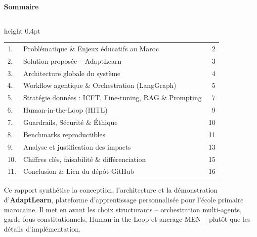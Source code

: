 \documentclass[11pt,a4paper]{article}
\begin{document}
\setcounter{page}{1}

{\color{primary}\Large\bfseries Sommaire}\\[-0.3em]
{\color{rulecolor}\hrule height 0.4pt}\vspace{1em}

\begin{tcolorbox}[colback=panel, colframe=rulecolor, boxrule=0.3pt, arc=1pt,
  left=10pt,right=10pt,top=8pt,bottom=8pt]
\small
\renewcommand{\baselinestretch}{1.15}
\begin{tabular}{@{}p{0.6cm}p{11cm}r@{}}
1.  & Problématique \& Enjeux éducatifs au Maroc               & 2  \\
2.  & Solution proposée -- AdaptLearn                          & 3  \\
3.  & Architecture globale du système                          & 4  \\
4.  & Workflow agentique \& Orchestration (LangGraph)          & 5  \\
5.  & Stratégie données : ICFT, Fine-tuning, RAG \& Prompting  & 7  \\
6.  & Human-in-the-Loop (HITL)                                 & 9  \\
7.  & Guardrails, Sécurité \& Éthique                          & 10 \\
8.  & Benchmarks reproductibles                                & 11 \\
9.  & Analyse et justification des impacts                     & 13 \\
10. & Chiffres clés, faisabilité \& différenciation            & 15 \\
11. & Conclusion \& Lien du dépôt GitHub                       & 16 \\
\end{tabular}
\end{tcolorbox}

\vspace{0.6em}
\begin{infobox}
Ce rapport synthétise la conception, l'architecture et la démonstration d'\textbf{AdaptLearn},
plateforme d'apprentissage personnalisée pour l'école primaire marocaine.
Il met en avant les choix structurants -- orchestration multi-agents, garde-fous
constitutionnels, Human-in-the-Loop et ancrage MEN -- plutôt que les détails
d'implémentation.
\end{infobox}
\end{document}
